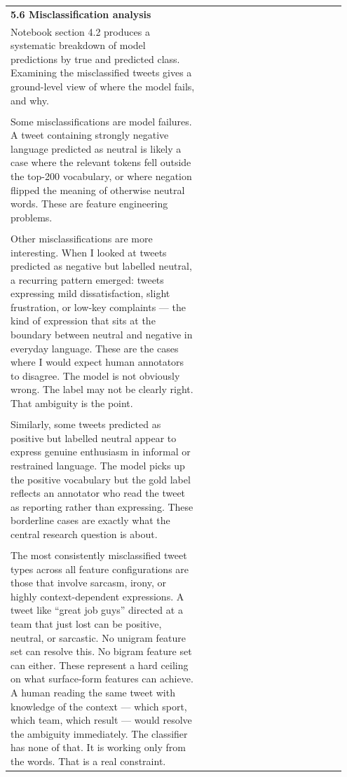 \documentclass[11pt]{article}
\begin{document}
\begin{longtable}{|p{0.55\linewidth}|p{0.40\linewidth}|}
\hline
\rule{0pt}{3.5cm} & \\
\hline
\multicolumn{2}{|l|}{\textbf{5.6 Misclassification analysis}} \\[2pt]
\hline
Notebook section 4.2 produces a systematic breakdown of model predictions by true and predicted class. Examining the misclassified tweets gives a ground-level view of where the model fails, and why. & \\[2pt]
\hline
\rule{0pt}{3.5cm} & \\
\hline
Some misclassifications are model failures. A tweet containing strongly negative language predicted as neutral is likely a case where the relevant tokens fell outside the top-200 vocabulary, or where negation flipped the meaning of otherwise neutral words. These are feature engineering problems. & \\[2pt]
\hline
\rule{0pt}{3.5cm} & \\
\hline
Other misclassifications are more interesting. When I looked at tweets predicted as negative but labelled neutral, a recurring pattern emerged: tweets expressing mild dissatisfaction, slight frustration, or low-key complaints --- the kind of expression that sits at the boundary between neutral and negative in everyday language. These are the cases where I would expect human annotators to disagree. The model is not obviously wrong. The label may not be clearly right. That ambiguity is the point. & \\[2pt]
\hline
\rule{0pt}{3.5cm} & \\
\hline
Similarly, some tweets predicted as positive but labelled neutral appear to express genuine enthusiasm in informal or restrained language. The model picks up the positive vocabulary but the gold label reflects an annotator who read the tweet as reporting rather than expressing. These borderline cases are exactly what the central research question is about. & \\[2pt]
\hline
\rule{0pt}{3.5cm} & \\
\hline
The most consistently misclassified tweet types across all feature configurations are those that involve sarcasm, irony, or highly context-dependent expressions. A tweet like ``great job guys'' directed at a team that just lost can be positive, neutral, or sarcastic. No unigram feature set can resolve this. No bigram feature set can either. These represent a hard ceiling on what surface-form features can achieve. A human reading the same tweet with knowledge of the context --- which sport, which team, which result --- would resolve the ambiguity immediately. The classifier has none of that. It is working only from the words. That is a real constraint. & \\[2pt]

\end{longtable}
\end{document}

